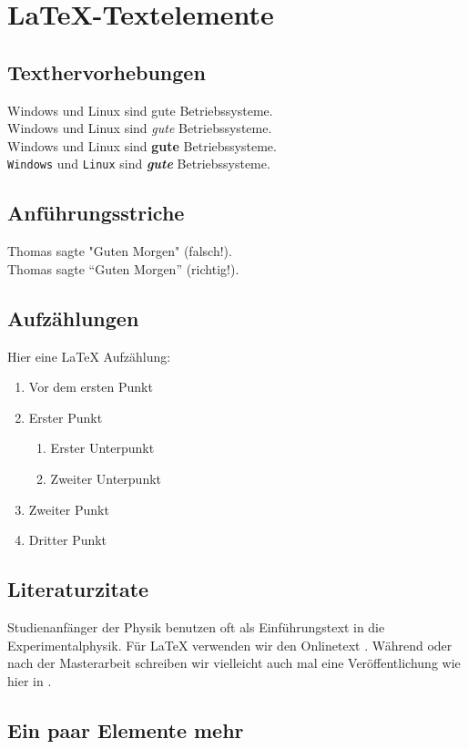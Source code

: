 \chapter{\LaTeX{}-Textelemente}
\label{chap:latex_elemente}
%
\section{Texthervorhebungen}
Windows und Linux sind gute Betriebssysteme.  \\
Windows und Linux sind \emph{gute} Betriebssysteme.  \\
Windows und Linux sind \textbf{gute} Betriebssysteme.  \\
\texttt{Windows} und \texttt{Linux} sind
\emph{\textbf{gute}} Betriebssysteme.  \\
%
\section{Anführungsstriche}
Thomas sagte "Guten Morgen" (falsch!). \\
Thomas sagte \enquote{Guten Morgen} (richtig!).
%
\section{Aufzählungen}
%
Hier eine \LaTeX{} Aufzählung:
\begin{enumerate}
  \item Vor dem ersten Punkt
  \item Erster Punkt
  \begin{enumerate}
    \item Erster Unterpunkt
    \item Zweiter Unterpunkt
  \end{enumerate}
  \item Zweiter Punkt
  \item Dritter Punkt   
\end{enumerate}
%
\section{Literaturzitate}
\label{sec:literatur}
Studienanfänger der Physik benutzen oft \cite{gerthsen2013physik} als
Einführungstext in die Experimentalphysik. Für \LaTeX{} verwenden wir
den Onlinetext \cite{daniel2015l2kurz}. Während oder nach der
Masterarbeit schreiben wir vielleicht auch mal eine Veröffentlichung
wie hier in \cite{heymans2006shear}.
%
\section{Ein paar Elemente mehr}
\blindtext[2]
\blindtext[2]

